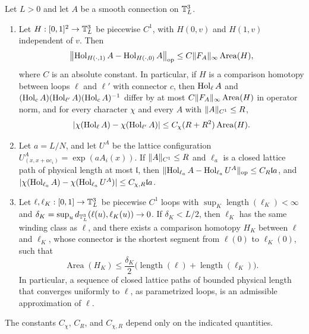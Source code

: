 \begin{lemma}\label{ch26:lem:holonomy-area-estimates}
Let $L>0$ and let $A$ be a smooth connection on $\mathbb T_L^3$.
\begin{enumerate}
\item Let $H:[0,1]^2\to\mathbb T_L^3$ be piecewise $C^1$, with $H(0,v)$ and $H(1,v)$ independent of $v$. Then
\[
 \bigl\lVert\operatorname{Hol}_{H(\cdot,1)}A-\operatorname{Hol}_{H(\cdot,0)}A\bigr\rVert_{\mathrm{op}}\le C\lVert F_A\rVert_\infty\operatorname{Area}(H),
\]
where $C$ is an absolute constant. In particular, if $H$ is a comparison homotopy between loops $\ell$ and $\ell'$ with connector $c$, then $\operatorname{Hol}_\ell A$ and $(\operatorname{Hol}_cA)(\operatorname{Hol}_{\ell'}A)(\operatorname{Hol}_cA)^{-1}$ differ by at most $C\lVert F_A\rVert_\infty\operatorname{Area}(H)$ in operator norm, and for every character $\chi$ and every $A$ with $\lVert A\rVert_{C^1}\le R$,
\[
 \lvert \chi(\operatorname{Hol}_\ell A)-\chi(\operatorname{Hol}_{\ell'}A)\rvert\le C_\chi(R+R^2)\operatorname{Area}(H).
\]
\item Let $a=L/N$, and let $U^A$ be the lattice configuration $U^A_{(x,x+ae_i)}=\exp(aA_i(x))$. If $\lVert A\rVert_{C^1}\le R$ and $\ell_a$ is a closed lattice path of physical length at most $\mathfrak l$, then $\lVert \operatorname{Hol}_{\ell_a}A-\operatorname{Hol}_{\ell_a}U^A\rVert_{\mathrm{op}}\le C_R\mathfrak la$, and $\lvert \chi(\operatorname{Hol}_{\ell_a}A)-\chi(\operatorname{Hol}_{\ell_a}U^A)\rvert\le C_{\chi,R}\mathfrak la$.
\item Let $\ell,\ell_K:[0,1]\to\mathbb T_L^3$ be piecewise $C^1$ loops with $\sup_K\operatorname{length}(\ell_K)<\infty$ and $\delta_K=\sup_{u}d_{\mathbb T_L^3}(\ell(u),\ell_K(u))\to0$. If $\delta_K<L/2$, then $\ell_K$ has the same winding class as $\ell$, and there exists a comparison homotopy $H_K$ between $\ell$ and $\ell_K$, whose connector is the shortest segment from $\ell(0)$ to $\ell_K(0)$, such that
\begin{equation}\label{ch26:eq:ruled-strip-area}
 \operatorname{Area}(H_K)\le\frac{\delta_K}2\bigl(\operatorname{length}(\ell)+\operatorname{length}(\ell_K)\bigr).
\end{equation}
In particular, a sequence of closed lattice paths of bounded physical length that converges uniformly to $\ell$, as parametrized loops, is an admissible approximation of $\ell$.
\end{enumerate}
The constants $C_\chi$, $C_R$, and $C_{\chi,R}$ depend only on the indicated quantities.
\end{lemma}

